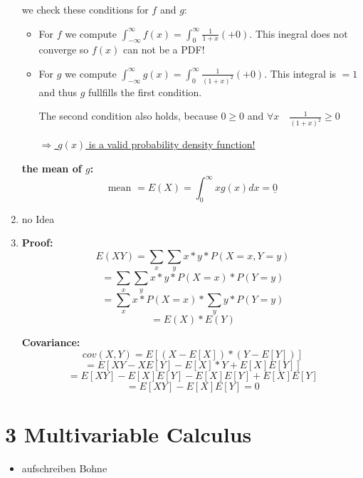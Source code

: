 \documentclass[12pt]{article}
\begin{document}
\begin{enumerate}[1)]
        we check these conditions for $f$ and $g$:
        \begin{itemize}
            \item 
                For $f$ we compute $\int_{-\infty}^{\infty} f(x) = \int_{0}^{\infty} \frac{1}{1+x} (+0)$. This inegral does not converge so $f(x)$ can not be a PDF!
            \item
                For $g$ we compute $\int_{-\infty}^{\infty} g(x) = \int_{0}^{\infty} \frac{1}{(1+x)^2} (+0)$. This integral is $ = 1$ and thus $g$ fullfills the first condition.

                The second condition also holds, because $0 \geq 0$ and $\forall x \quad \frac{1}{(1+x)^2} \geq 0$

                \underline{$\Rightarrow$ $g(x)$ is a valid probability density function!}

        \end{itemize}


        \textbf{the mean of $g$:}
        $$\text{mean } = E(X) = \int_0^{\infty} x g(x) dx = \underline{ 0 }$$ 

    \item
        no Idea

    \item
        \textbf{Proof:}\\
        $$ E( X Y ) = \sum_x \sum_y x * y * P(X=x, Y=y) $$
        $$ = \sum_x \sum_y x * y * P(X=x) * P(Y=y)$$
        $$ = \sum_x  x * P(X=x) * \sum_y y * P(Y=y)$$
        $$ = E(X) * E(Y)$$

        \textbf{Covariance:}\\
        $$ cov(X,Y) = E[(X - E[X]) * (Y - E[Y])] $$
        $$ = E[XY - X E[Y] - E[X]*Y + E[X]E[Y]]$$
        $$ = E[XY] - E[X]E[Y] - E[X]E[Y] + E[X]E[Y]$$
        $$ = E[XY] - E[X]E[Y] = 0$$

                
\end{enumerate}



\newpage
\section*{3 Multivariable Calculus}

\begin{itemize}
    \item 
        aufschreiben Bohne
\end{itemize}
\end{document}
